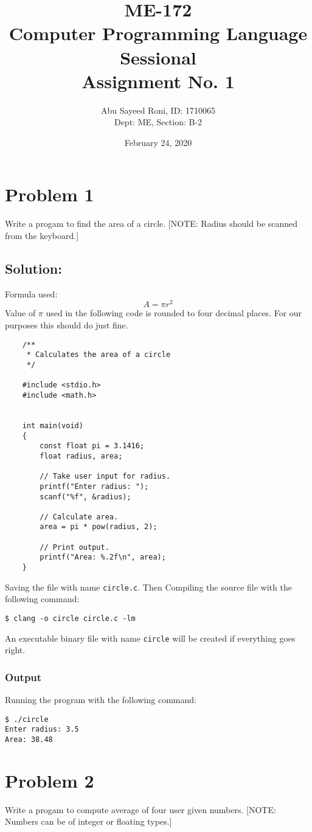 \documentclass[12pt, letterpaper]{report}
\title{ME-172\\Computer Programming Language Sessional\\Assignment No. 1}
\author{Abu Sayeed Roni, ID: 1710065\\Dept: ME, Section: B-2}
\date{February 24, 2020}
\begin{document}
\maketitle

\section*{Problem 1}
{\large Write a progam to find the area of a circle. [NOTE: Radius should be scanned from the keyboard.]}

\subsection*{Solution:}
Formula used: 
\begin{displaymath}
A = \pi r^2
\end{displaymath}
Value of $\pi$ used in the following code is rounded to four decimal places. For our purposes this should do just fine.
\begin{verbatim}
    /**
     * Calculates the area of a circle
     */

    #include <stdio.h>
    #include <math.h>


    int main(void)
    {
        const float pi = 3.1416;
        float radius, area;

        // Take user input for radius.
        printf("Enter radius: ");
        scanf("%f", &radius);

        // Calculate area.
        area = pi * pow(radius, 2);

        // Print output.
        printf("Area: %.2f\n", area);
    }
\end{verbatim}
Saving the file with name \texttt{circle.c}. Then Compiling the source file with the following command:

\begin{verbatim}
$ clang -o circle circle.c -lm
\end{verbatim}
An executable binary file with name \texttt{circle} will be created if everything goes right.
\subsubsection*{Output}
Running the program with the following command:
\begin{verbatim}
$ ./circle
Enter radius: 3.5
Area: 38.48
\end{verbatim}

\section*{Problem 2}
{\large Write a progam to compute average of four user given numbers. [NOTE: Numbers can be of integer or floating types.]}
\end{document}
